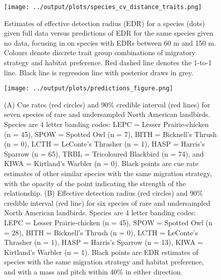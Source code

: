 \documentclass[12pt]{article}
\begin{document}
\begin{figure}[h]
	\texttt{[image: ../output/plots/species\_cv\_distance\_traits.png]}
	\caption{Estimates of effective detection radius (EDR) for a species (dots) given full data versus predictions of EDR for the same species given no data, focusing in on species with EDRs between 60 m and 150 m. Colours denote discrete trait group combinations of migratory strategy and habitat preference. Red dashed line denotes the 1-to-1 line. Black line is regression line with posterior draws in grey.}
	\label{fig:distance_cv_traits}
\end{figure}

\begin{figure}[h]
	\texttt{[image: ../output/plots/predictions\_figure.png]}
	\caption{(A) Cue rates (red circles) and 90\% credible interval (red lines) for seven species of rare and undersampled North American landbirds. Species are 4 letter banding codes: LEPC = Lesser Prairie-chicken (n = 45), SPOW = Spotted Owl (n = 7), BITH = Bicknell's Thrush (n = 0), LCTH = LeConte's Thrasher (n = 1), HASP = Harris's Sparrow (n = 65), TRBL = Tricoloured Blackbird (n = 74), and KIWA = Kirtland's Warbler (n = 0). Black points are cue rate estimates of other similar species with the same migration strategy, with the opacity of the point indicating the strength of the relationship. (B) Effective detection radius (red circles) and 90\% credible interval (red line) for six species of rare and undersampled North American landbirds. Species are 4 letter banding codes: LEPC = Lesser Prairie-chicken (n = 45), SPOW = Spotted Owl (n = 28), BITH = Bicknell's Thrush (n = 0), LCTH = LeConte's Thrasher (n = 1), HASP = Harris's Sparrow (n = 13), KIWA = Kirtland's Warbler (n = 1). Black points are EDR estimates of species with the same migration strategy and habitat preference, and with a mass and pitch within 40\% in either direction.}
	\label{fig:predictions}
\end{figure}
\end{document}
